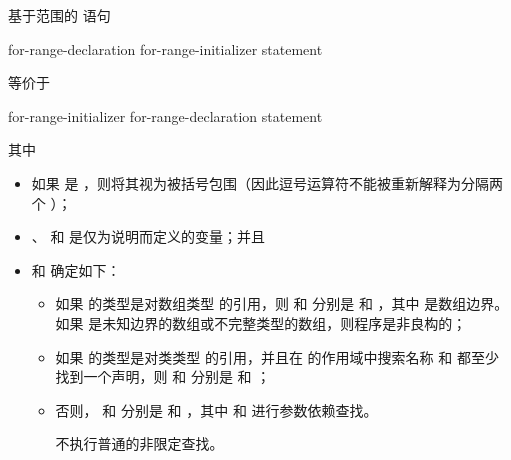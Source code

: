 \pnum
基于范围的  语句
\begin{ncsimplebnf}
 \terminal{(}  for-range-declaration \terminal{:} for-range-initializer \terminal{)} statement
\end{ncsimplebnf}
等价于
\begin{ncsimplebnf}
\terminal{\{}\br
\bnfindent {}\br
\bnfindent {} \terminal{\&\&} \terminal{=} for-range-initializer \terminal{;}\br
\bnfindent {}  \terminal{=}  \terminal{;}\br
\bnfindent {}  \terminal{=}  \terminal{;}\br
\bnfindent {} \terminal{(} \terminal{;}  \terminal{!=} \terminal{;} \terminal{++} \terminal{)} \terminal{\{}\br
\bnfindent\bnfindent for-range-declaration \terminal{=} \terminal{*}  \terminal{;}\br
\bnfindent\bnfindent statement\br
\bnfindent \terminal{\}}\br
\terminal{\}}
\end{ncsimplebnf}
其中
\begin{itemize}
\item
如果  是 ，则将其视为被括号包围（因此逗号运算符不能被重新解释为分隔两个 ）；

\item {}、 和  是仅为说明而定义的变量；并且

\item
{} 和  确定如下：

\begin{itemize}
\item 如果  的类型是对数组类型  的引用，则  和  分别是  和  \tcode{+} ，其中  是数组边界。如果  是未知边界的数组或不完整类型的数组，则程序是非良构的；

\item 如果  的类型是对类类型  的引用，并且在  的作用域中搜索名称  和  都至少找到一个声明，则  和  分别是  和 ；

\item 否则， 和  分别是  和 ，其中  和  进行参数依赖查找。
\begin{note}
不执行普通的非限定查找。
\end{note}
\end{itemize}
\end{itemize}
